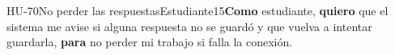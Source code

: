 \begin{historia}[1]{HU-70}{No perder las respuestas}{Estudiante}{1}{5}{\textbf{Como} estudiante, \textbf{quiero} que el sistema me avise si alguna respuesta no se guardó y que vuelva a intentar guardarla, \textbf{para} no perder mi trabajo si falla la conexión.}
\end{historia}
